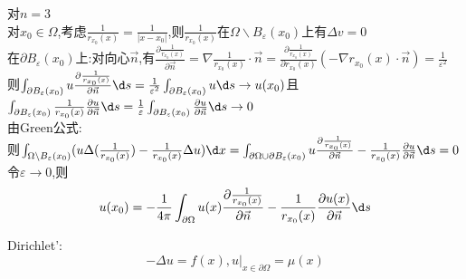 \begin{jie}对$n=3$\\
对$x_0\in \Omega$,考虑$\frac{1}{r_{x_0}(x)}=\frac{1}{|x-x_0|}$,则$\frac{1}{r_{x_0}(x)}$在$\Omega\backslash B_{\varepsilon}(x_0)$上有$\Delta v=0$\\
在$\partial B_{\varepsilon}(x_0)$上:对向心$\vec{n}$,有$\frac{\partial\frac{1}{r_{x_0}(x)}}{\partial \vec{n}}=\nabla\frac{1}{r_{x_0}(x)}\cdot\vec{n} =\frac{\partial \frac{1}{r_{x_0}(x)}}{\partial r_{x_0}(x)}(-\nabla r_{x_0}(x)\cdot\vec{n})=\frac{1}{\varepsilon^2}$\\
则$\int_{\partial B_{\varepsilon}(x_0)}u\frac{\partial\frac{1}{r_{x_0}(x)}}{\partial \vec{n}}\d s=\frac{1}{\varepsilon^2}\int_{\partial B_{\varepsilon}(x_0)}u\d s\to u(x_0)$且$\int_{\partial B_{\varepsilon}(x_0)}\frac{1}{r_{x_0}(x)}\frac{\partial u}{\partial \vec{n}}\d s=\frac{1}{\varepsilon}\int_{\partial B_{\varepsilon}(x_0)}\frac{\partial u}{\partial \vec{n}}\d s\to 0$\\
由Green公式:\\
则$\int_{\Omega\backslash B_{\varepsilon}(x_0)}(u\Delta(\frac{1}{r_{x_0}(x)})-\frac{1}{r_{x_0}(x)}\Delta u)\d x=\int_{\partial \Omega\cup\partial B_{\varepsilon}(x_0)}u\frac{\partial\frac{1}{r_{x_0}(x)}}{\partial \vec{n}}-\frac{1}{r_{x_0}(x)}\frac{\partial u}{\partial \vec{n}}\d s=0$\\
令$\varepsilon\to0$,则
\[u(x_0)=-\frac{1}{4\pi}\int_{\partial \Omega}u(x)\frac{\partial\frac{1}{r_{x_0}(x)}}{\partial \vec{n}}-\frac{1}{r_{x_0}(x)}\frac{\partial u(x)}{\partial \vec{n}}\d s\]
\end{jie}

Dirichlet':
\[-\Delta u=f(x),u|_{x\in\partial\Omega}=\mu(x)\]

